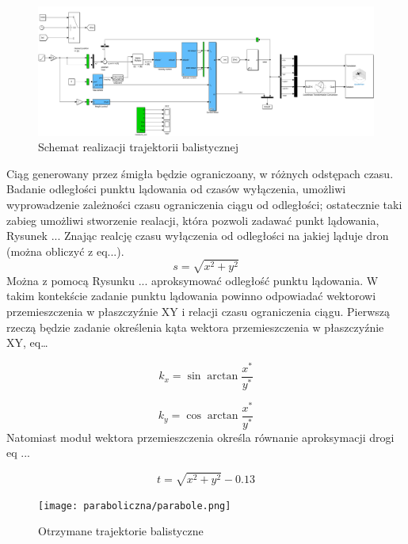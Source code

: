 \documentclass[polish,11pt,a4paper]{article}
\begin{document}
\begin{figure}[ht]
    \centering
    \includegraphics[width=1\linewidth]{paraboliczna/sc_parab.png}
    \caption{Schemat realizacji trajektorii balistycznej}
    \label{fig:enter-label}
\end{figure}

Ciąg generowany przez śmigła będzie ograniczoany, w różnych odstępach czasu. Badanie odległości punktu
lądowania od czasów wyłączenia, umożliwi wyprowadzenie zależności czasu ograniczenia ciągu od odległości;
ostatecznie taki zabieg umożliwi stworzenie realacji, która pozwoli zadawać punkt lądowania, Rysunek ...
Znając realcję czasu wyłączenia od odległości na jakiej ląduje dron (można obliczyć z eq...).
\begin{equation}
    s = \sqrt{x^{2}+y^{2}}
\end{equation}
Można z pomocą Rysunku ... aproksymować odległość punktu lądowania. W takim kontekście zadanie punktu lądowania powinno odpowiadać
wektorowi przemieszczenia w płaszczyźnie XY i relacji czasu ograniczenia ciągu. Pierwszą rzeczą będzie zadanie określenia kąta wektora przemieszczenia
w płaszczyźnie XY, eq\dots


\begin{equation}
    k_{x} = \sin \arctan \frac{x^{*}}{y^{*}}
\end{equation}

\begin{equation}
    k_{y} = \cos \arctan \frac{x^{*}}{y^{*}}
\end{equation}
Natomiast moduł wektora przemieszczenia określa równanie aproksymacji drogi eq ...

\begin{equation}
    t = \sqrt{x^{2}+y^{2}} - 0.13
\end{equation}

\begin{figure}[ht]
    \centering
    \texttt{[image: paraboliczna/parabole.png]}
    \caption{Otrzymane trajektorie balistyczne}
    \label{fig:enter-label}
\end{figure}
\end{document}
